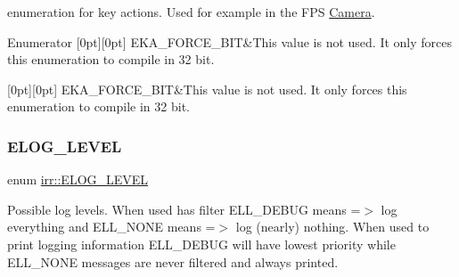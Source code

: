 enumeration for key actions. Used for example in the F\+PS \hyperlink{classCamera}{Camera}. 

\begin{DoxyEnumFields}{Enumerator}
[0pt][0pt]{}\mbox{\label{namespaceirr_aa9946ac9f3142f9e790ce52d59fd6168a8329ce2269a20c9da94c54bc9a2d2312}} 
E\+K\+A\+\_\+\+F\+O\+R\+C\+E\+\_\+B\+IT&This value is not used. It only forces this enumeration to compile in 32 bit. \\
\hline

[0pt][0pt]{}\mbox{\label{namespaceirr_aa9946ac9f3142f9e790ce52d59fd6168a8329ce2269a20c9da94c54bc9a2d2312}} 
E\+K\+A\+\_\+\+F\+O\+R\+C\+E\+\_\+B\+IT&This value is not used. It only forces this enumeration to compile in 32 bit. \\
\hline

\end{DoxyEnumFields}
\mbox{\label{namespaceirr_aa2d1cac68606a25ed24cfffccfa30a92}} 
\subsubsection{\texorpdfstring{E\+L\+O\+G\+\_\+\+L\+E\+V\+EL}{ELOG\_LEVEL}\hspace{0.1cm}{\footnotesize\ttfamily [1/2]}}
{\footnotesize\ttfamily enum \hyperlink{namespaceirr_aa2d1cac68606a25ed24cfffccfa30a92}{irr\+::\+E\+L\+O\+G\+\_\+\+L\+E\+V\+EL}}



Possible log levels. When used has filter E\+L\+L\+\_\+\+D\+E\+B\+UG means =$>$ log everything and E\+L\+L\+\_\+\+N\+O\+NE means =$>$ log (nearly) nothing. When used to print logging information E\+L\+L\+\_\+\+D\+E\+B\+UG will have lowest priority while E\+L\+L\+\_\+\+N\+O\+NE messages are never filtered and always printed. 


